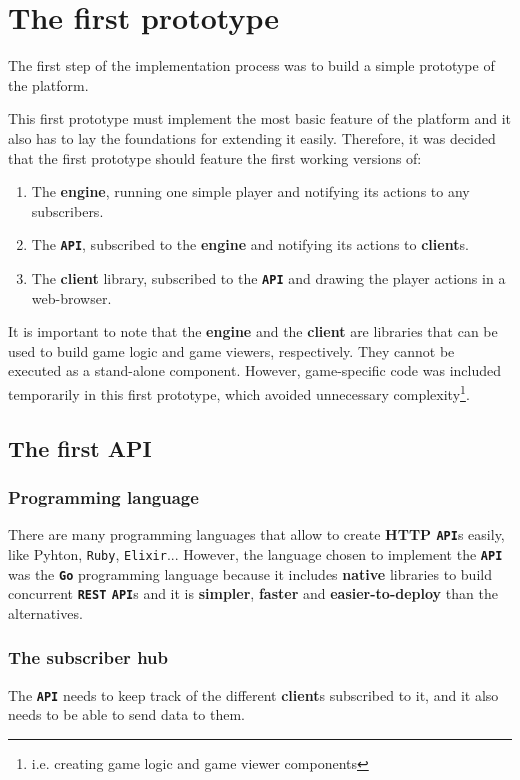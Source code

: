 \documentclass[a4paper,11pt,titlepage,abstract,numbers=noenddot,automark,mnsy,intlimits,rgb,dvipsnames]{report}
\begin{document}
\chapter{The first prototype}
\label{first_prototype}
The first step of the implementation process was to build a simple prototype of the platform.

This first prototype must implement the most basic feature of the platform and it also has to lay the foundations for extending
it easily. Therefore, it was decided that the first prototype should feature the first working versions of:
\begin{enumerate}
\item
The \textbf{engine}, running one simple player and notifying its actions to any subscribers.
\item
The \textbf{\texttt{API}}, subscribed to the \textbf{engine} and notifying its actions to \textbf{client}s.
\item
The \textbf{client} library, subscribed to the \textbf{\texttt{API}} and drawing the player actions in a web-browser.
\end{enumerate}
It is important to note that the \textbf{engine} and the \textbf{client} are libraries that can be used to build
game logic and game viewers, respectively. They cannot be executed as a stand-alone component. However,
game-specific code was included temporarily in this first prototype, which avoided unnecessary complexity\footnote{i.e.
creating game logic and game viewer components}.
\section{The first API}
\subsection{Programming language}
There are many programming languages that allow to create \textbf{HTTP \texttt{API}}s easily, like Pyhton, \texttt{Ruby}, \texttt{Elixir}... However,
the language chosen to implement the \textbf{\texttt{API}} was the \textbf{\texttt{Go}} programming language because it includes \textbf{native}
libraries to build concurrent \textbf{\texttt{REST} \texttt{API}}s and it is \textbf{simpler}, \textbf{faster} and \textbf{easier-to-deploy} than the alternatives.
\subsection{The subscriber hub}
The \textbf{\texttt{API}} needs to keep track of the different \textbf{client}s subscribed to it, and it also needs to be able to send data
to them.
\end{document}
